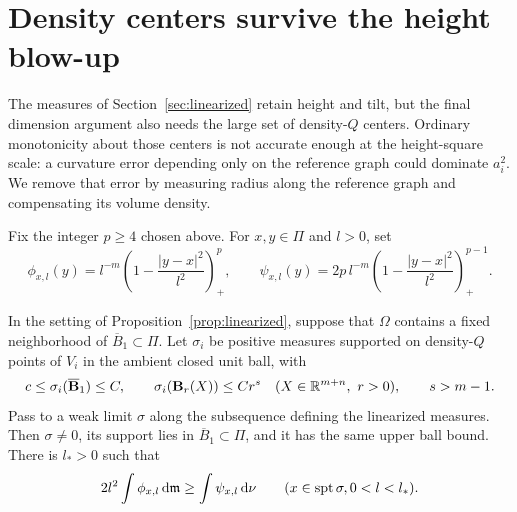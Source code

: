 \section{Density centers survive the height blow-up}\label{sec:density-centers}

The measures of Section~\ref{sec:linearized} retain height and tilt, but
the final dimension argument also needs the large set of density-$Q$
centers. Ordinary monotonicity about those centers is not accurate enough
at the height-square scale: a curvature error depending only on the
reference graph could dominate $a_i^2$. We remove that error by measuring
radius along the reference graph and compensating its volume density.

Fix the integer $p\ge4$ chosen above. For $x,y\in\Pi$ and $l>0$, set
\begin{equation}\label{eq:limit-kernels}
 \phi_{x,l}(y)=l^{-m}\left(1-\frac{|y-x|^2}{l^2}\right)_+^p,
 \qquad
 \psi_{x,l}(y)=2p\,l^{-m}
                  \left(1-\frac{|y-x|^2}{l^2}\right)_+^{p-1}.
\end{equation}

\begin{proposition}
\label{prop:density-comparison}
In the setting of Proposition~\ref{prop:linearized}, suppose that
$\Omega$ contains a fixed neighborhood of $\overline B_1\subset\Pi$.
Let $\sigma_i$ be positive measures supported on density-$Q$ points of
$V_i$ in the ambient closed unit ball, with
\[
 c\le\sigma_i(\overline{\mathbf B}_1)\le C,
 \qquad \sigma_i(\mathbf B_r(X))\le Cr^s
 \quad(X\in\mathbb R^{m+n},\ r>0),\qquad s>m-1.
\]
Pass to a weak limit $\sigma$ along the subsequence defining the
linearized measures. Then $\sigma\ne0$, its support lies in
$\overline B_1\subset\Pi$, and it has the same upper ball bound.
There is $l_*>0$ such that
\begin{equation}\label{eq:center-comparison}
 2l^2\int\phi_{x,l}\,\mathrm d\mathfrak m
       \ge\int\psi_{x,l}\,\mathrm d\nu
 \qquad(x\in\operatorname{spt}\sigma, 0<l<l_*).
\end{equation}
\end{proposition}

